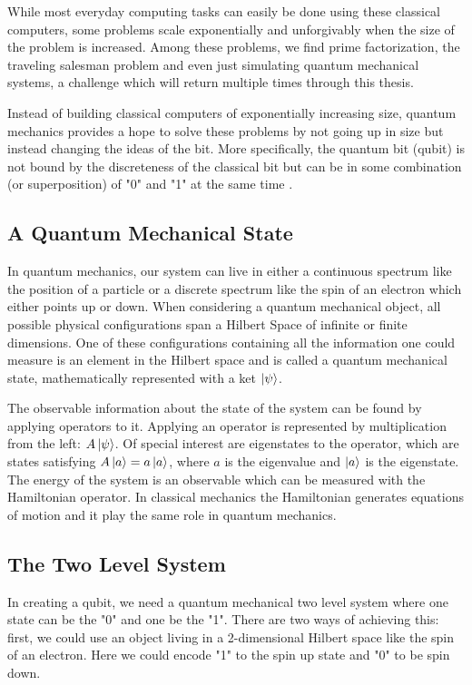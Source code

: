 While most everyday computing tasks can easily be done using these classical computers, some problems scale exponentially and unforgivably when the size of the problem is increased. Among these problems, we find prime factorization, the traveling salesman problem and even just simulating quantum mechanical systems, a challenge which will return multiple times through this thesis.

Instead of building classical computers of exponentially increasing size, quantum mechanics provides a hope to solve these problems by not going up in size but instead changing the ideas of the bit. More specifically, the quantum bit (qubit) is not bound by the discreteness of the classical bit but can be in some combination (or superposition) of "0" and "1" at the same time \cite{krantz_week_2019}.

\subsection{A Quantum Mechanical State}
In quantum mechanics, our system can live in either a continuous spectrum like the position of a particle or a discrete spectrum like the spin of an electron which either points up or down. When considering a quantum mechanical object, all possible physical configurations span a Hilbert Space of infinite or finite dimensions. One of these configurations containing all the information one could measure is an element in the Hilbert space and is called a quantum mechanical state, mathematically represented with a ket $\ket{\psi}$. \cite{sakurai_modern_2021}

The observable information about the state of the system can be found by applying operators to it. Applying an operator is represented by multiplication from the left: $A\ket{\psi}$. Of special interest are eigenstates to the operator, which are states satisfying $A\ket{a} = a \ket{a}$, where $a$ is the eigenvalue and $\ket{a}$ is the eigenstate. The energy of the system is an observable which can be measured with the Hamiltonian operator. In classical mechanics the Hamiltonian generates equations of motion and it play the same role in quantum mechanics. \cite{sakurai_modern_2021}

\subsection{The Two Level System}\label{sec:tls}
In creating a qubit, we need a quantum mechanical two level system where one state can be the "0" and one be the "1". There are two ways of achieving this: first, we could use an object living in a 2-dimensional Hilbert space like the spin of an electron. Here we could encode "1" to the spin up state and "0" to be spin down. 

